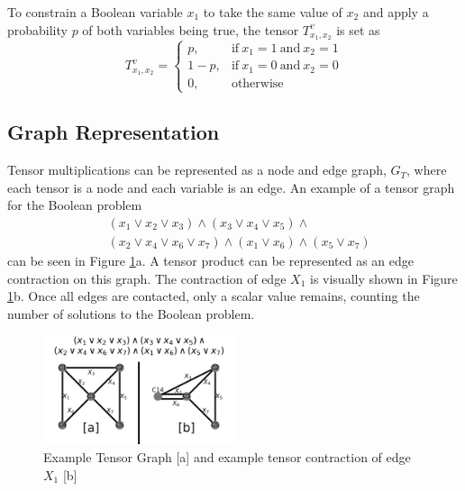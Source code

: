 To constrain a Boolean variable \(x_1\) to take the same value of \(x_2\) and apply a probability \(p\) of both variables being true, the tensor \(T^v_{x_1,x_2}\) is set as \begin{equation*}
T^v_{x_1,x_2}=
\begin{cases}
    p, & \text{if}\ x_1=1\ \text{and}\ x_2=1 \\
    1-p, & \text{if}\ x_1=0\ \text{and}\ x_2=0 \\
    0, & \text{otherwise}
\end{cases}
\end{equation*}

\hypertarget{graph-representation}{%
\subsection{Graph Representation}\label{graph-representation}}

Tensor multiplications can be represented as a node and edge graph, \(G_T\), where each tensor is a node and each variable is an edge. An example of a tensor graph for the Boolean problem \begin{equation*}
\begin{split}
& (x_1 \lor x_2 \lor x_3) \land (x_3 \lor x_4 \lor x_5) \land \\
& (x_2 \lor x_4 \lor x_6 \lor x_7) \land (x_1 \lor x_6) \land (x_5 \lor x_7)
\end{split}
\end{equation*} can be seen in Figure \ref{fig:Tensor Graph Example}a. A tensor product can be represented as an edge contraction on this graph. The contraction of edge \(X_1\) is visually shown in Figure \ref{fig:Tensor Graph Example}b. Once all edges are contacted, only a scalar value remains, counting the number of solutions to the Boolean problem.

\begin{figure}[t]
\caption{Example Tensor Graph [a] and example tensor contraction of edge $X_1$ [b]}
\label{fig:Tensor Graph Example}
\includegraphics[width=0.5\textwidth]{../figures/TensorGraphExample.png}
\end{figure}

